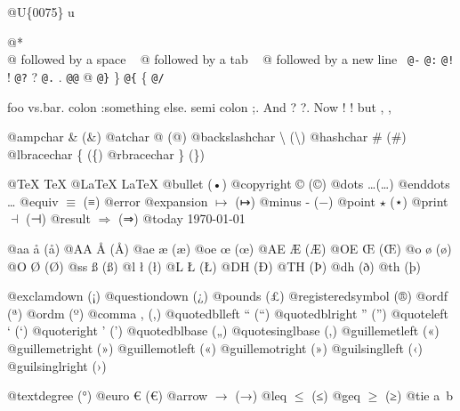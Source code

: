 \documentclass{book}
\renewcommand{\_}{\Texinfounderscore\discretionary{}{}{}}
\begin{document}
@U\{0075\} u

@* \leavevmode{}\\
@ followed by a space
\ {}
@ followed by a tab
\ {}
@ followed by a new line
\ {}\texttt{@-} \-{}
\texttt{@:} \@
\texttt{@!} \@!
\texttt{@?} \@?
\texttt{@.} \@.
\texttt{@@} @
\texttt{@\}} \}
\texttt{@\{} \{
\texttt{@/} 

foo vs.\@ bar. 
colon :\@And something else.
semi colon ;\@.
And ? ?\@.
Now ! !\@@
but , ,\@

@ampchar \& (\&)
@atchar @ (@)
@backslashchar \textbackslash{} (\textbackslash{})
@hashchar \# (\#)
@lbracechar \{ (\{)
@rbracechar \} (\})

@TeX \TeX{}
@LaTeX \LaTeX{}
@bullet \textbullet{} (•)
@copyright \copyright{} (©)
@dots \dots{}\@ (…)
@enddots \dots{}
@equiv $\equiv{}$ (≡)
@error 
@expansion $\mapsto{}$ (↦)
@minus - (−)
@point $\star{}$ (⋆)
@print $\dashv{}$ (⊣)
@result $\Rightarrow{}$ (⇒)
@today \today{}

@aa \aa{} (å)
@AA \AA{} (Å)
@ae \ae{} (æ)
@oe \oe{} (œ)
@AE \AE{} (Æ)
@OE \OE{} (Œ)
@o \o{} (ø)
@O \O{} (Ø)
@ss \ss{} (ß)
@l \l{} (ł)
@L \L{} (Ł)
@DH \DH{} (Ð)
@TH \TH{} (Þ)
@dh \dh{} (ð)
@th \th{} (þ)

@exclamdown \textexclamdown{} (¡)
@questiondown \textquestiondown{} (¿)
@pounds \textsterling{} (£)
@registeredsymbol \circledR{} (®)
@ordf \textordfeminine{} (ª)
@ordm \textordmasculine{} (º)
@comma , (,)
@quotedblleft \textquotedblleft{} (“)
@quotedblright \textquotedblright{} (”)
@quoteleft \textquoteleft{} (‘)
@quoteright \textquoteright{} (’)
@quotedblbase \quotedblbase{} („)
@quotesinglbase \quotesinglbase{} (‚)
@guillemetleft \guillemotleft{} («)
@guillemetright \guillemotright{} (»)
@guillemotleft \guillemotleft{} («)
@guillemotright \guillemotright{} (»)
@guilsinglleft \guilsinglleft{} (‹)
@guilsinglright \guilsinglright{} (›)

@textdegree \textdegree{} (°)
@euro \euro{} (€)
@arrow $\rightarrow{}$ (→)
@leq $\leq{}$ (≤)
@geq $\geq{}$ (≥)
@tie a~b
\end{document}
